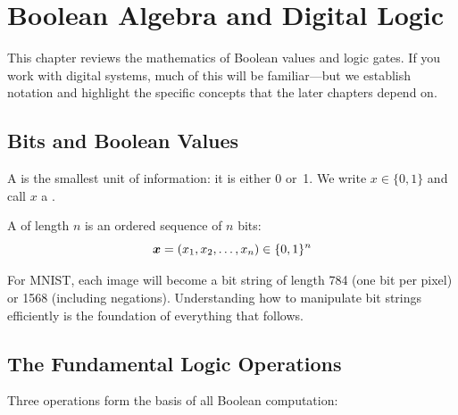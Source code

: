 \chapter{Boolean Algebra and Digital Logic}
\label{ch:boolean}

This chapter reviews the mathematics of Boolean values and logic gates.
If you work with digital systems, much of this will be familiar---but
we establish notation and highlight the specific concepts that the later
chapters depend on.

\section{Bits and Boolean Values}
\label{sec:bits}

A  is the smallest unit of information: it is either 0
or~1. We write $x \in \{0, 1\}$ and call $x$ a .

A  of length $n$ is an ordered sequence of $n$
bits:
\begin{equation}
  \bm{x} = (x_1, x_2, \ldots, x_n) \in \{0, 1\}^n
  \label{eq:bitstring}
\end{equation}

For MNIST, each image will become a bit string of length 784 (one bit
per pixel) or 1568 (including negations). Understanding how to
manipulate bit strings efficiently is the foundation of everything that
follows.


\section{The Fundamental Logic Operations}
\label{sec:logic-ops}

Three operations form the basis of all Boolean computation:

